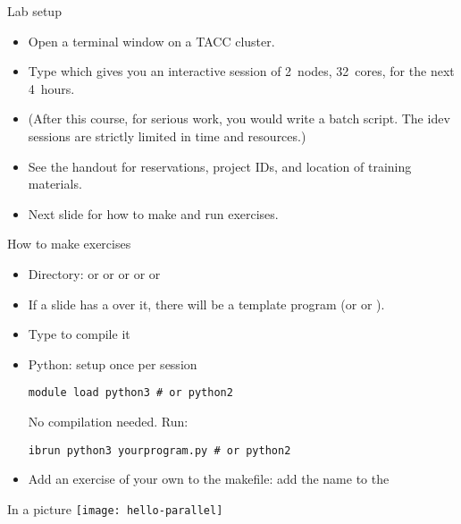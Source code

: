 \begin{tacc}
  \begin{frame}[containsverbatim]{Lab setup}
    \begin{itemize}
    \item Open a terminal window on a TACC cluster.
    \item Type  which gives
      you an interactive session of 2~nodes, 32~cores, for the next
      4~hours.
    \item (After this course, for serious work, you would write a
      batch script. The idev sessions are strictly limited in time and
      resources.)
    \item See the handout for reservations, project IDs, and location of training materials.
    \item Next slide for how to make and run exercises.
    \end{itemize}
  \end{frame}
\end{tacc}

\begin{frame}[containsverbatim]{How to make exercises}
  \begin{itemize}
  \item Directory:  or  or  or 
    or  or 
  \item If a slide has a  over it, there will be a
    template program  (or  or ).
  \item Type  to compile it
  \item Python: setup once per session
\begin{verbatim}
module load python3 # or python2
\end{verbatim}
No compilation needed. Run:
\begin{verbatim}
ibrun python3 yourprogram.py # or python2
\end{verbatim}
\item Add an exercise of your own to the makefile: add the name to
    the 
  \end{itemize}
\end{frame}

\begin{exerciseframe}[hello]
  
\end{exerciseframe}

\begin{frame}{In a picture}
  \texttt{[image: hello-parallel]}
\end{frame}

